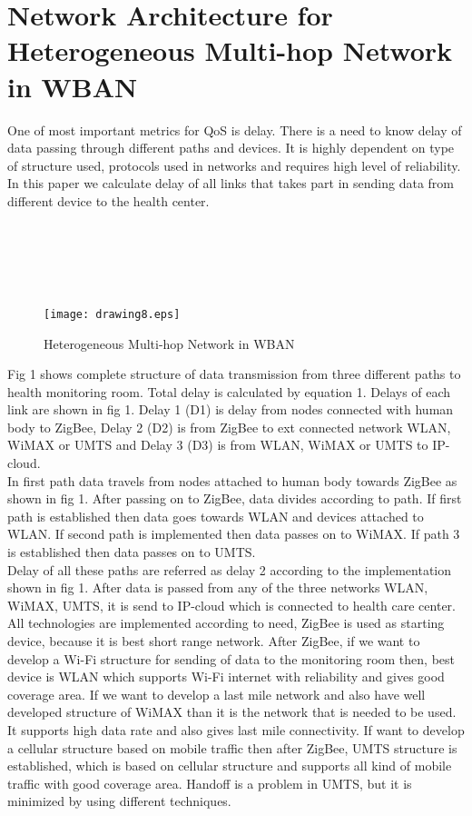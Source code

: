 \documentclass[11pt, conference, compsocconf, onecolumn]{IEEEtran}
\begin{document}
\section{Network Architecture for Heterogeneous Multi-hop Network in WBAN}
One of most important metrics for QoS is delay. There is a need to know delay of data passing through different paths and devices. It is highly dependent on type of structure used, protocols used in networks and requires high level of reliability. In this paper we calculate delay of all links that takes part in sending data from different device to the health center.

      
\\
  
\\
  
\\
  
\\
\begin{figure}[!h]
\centering
\caption{Heterogeneous Multi-hop Network in WBAN}
\texttt{[image: drawing8.eps]}
\end{figure}
\indent Fig 1 shows complete structure of data transmission from three different paths to health monitoring room. Total delay is calculated by equation 1. Delays of each link are shown in fig 1. Delay 1 (D1) is delay from nodes connected with human body to ZigBee, Delay 2 (D2) is from ZigBee to ext connected network WLAN, WiMAX or UMTS and Delay 3 (D3) is from WLAN, WiMAX or UMTS to IP-cloud. \\
\indent In first path data travels from nodes attached to human body  towards ZigBee as shown in fig 1. After passing on to ZigBee, data divides according to path. If first path is established then data goes towards WLAN and devices attached to WLAN. If second path is implemented then data passes on to WiMAX. If path 3 is established then data passes on to UMTS.\\
\indent Delay of all these paths are referred as delay 2 according to the implementation shown in fig 1. After data is passed from any of the three networks WLAN, WiMAX, UMTS, it is send to IP-cloud which is connected to health care center.\\
\indent All technologies are implemented according to need, ZigBee is used as starting device, because it is best short range network. After ZigBee, if we want to develop a Wi-Fi structure for sending of data to the monitoring room then, best device is WLAN which supports Wi-Fi internet with reliability and gives good coverage area. If we want to develop a last mile network and also have well developed structure of WiMAX than it is the network that is needed to be used. It supports high data rate and also gives last mile connectivity. If want to develop a cellular structure based on mobile traffic then after ZigBee, UMTS structure is established, which is based on cellular structure and supports all kind of mobile traffic with good coverage area. Handoff is a problem in UMTS, but it is minimized by using different techniques.
\end{document}
